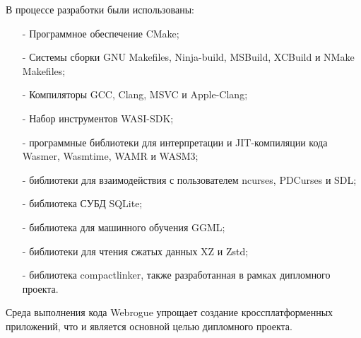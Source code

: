 В процессе разработки были использованы:
\begin{itemize}
    \item[-] Программное обеспечение CMake;
    \item[-] Системы сборки GNU Makefiles, Ninja-build, MSBuild, XCBuild и NMake Makefiles;
    \item[-] Компиляторы GCC, Clang, MSVC и Apple-Clang;
    \item[-] Набор инструментов WASI-SDK;
    \item[-] программные библиотеки для интерпретации и JIT-компиляции кода Wasmer, Wasmtime, WAMR и WASM3;
    \item[-] библиотеки для взаимодействия с пользователем ncurses, PDCurses и SDL;\item[-] библиотека СУБД SQLite;
    \item[-] библиотека для машинного обучения GGML;
    \item[-] библиотеки для чтения сжатых данных XZ и Zstd;
    \item[-] библиотека compactlinker, также разработанная в рамках дипломного проекта.
\end{itemize}

Среда выполнения кода Webrogue упрощает создание кроссплатформенных приложений, что и является основной целью дипломного проекта.
